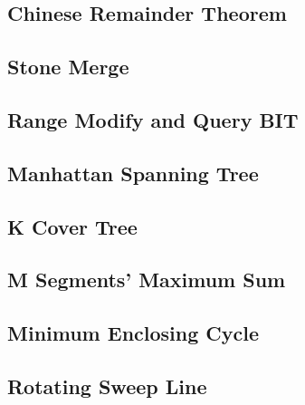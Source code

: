 \documentclass[a4paper,10pt,twocolumn,oneside]{article}
\begin{document}
\subsection{Chinese Remainder Theorem}


\subsection{Stone Merge}


\subsection{Range Modify and Query BIT}


\subsection{Manhattan Spanning Tree}


\subsection{K Cover Tree}


\subsection{M Segments' Maximum Sum}


%

%

\subsection{Minimum Enclosing Cycle}


\subsection{Rotating Sweep Line}


%
\end{document}
